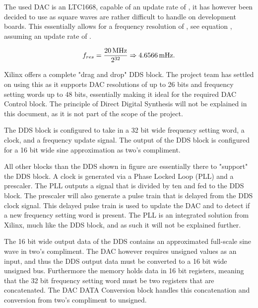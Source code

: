 The used DAC is an LTC1668, capable of an update rate of , it has however been decided to use  as  square waves are rather difficult to handle on development boards. This essentially allows for a frequency resolution of , see equation , assuming an update rate of .

\begin{equation}
    \label{eq:7_2_3_resolution}
    f_{res} = \frac{\SI{20}{\mega\hertz}}{2^{32}} \Rightarrow \SI{4.6566}{\milli\hertz}. 
\end{equation}

Xilinx offers a complete "drag and drop" DDS block. The project team has settled on using this as it supports DAC resolutions of up to 26 bits and frequency setting words up to 48 bits, essentially making it ideal for the required DAC Control block. The principle of Direct Digital Synthesis will not be explained in this document, as it is not part of the scope of the project.

The DDS block is configured to take in a 32 bit wide frequency setting word, a  clock, and a frequency update signal. The output of the DDS block is configured for a 16 bit wide sine approximation as two's compliment.

All other blocks than the DDS shown in figure  are essentially there to "support" the DDS block. A  clock is generated via a Phase Locked Loop (PLL) and a prescaler. The PLL outputs a  signal that is divided by ten and fed to the DDS block. The prescaler will also generate a  pulse train that is delayed from the DDS clock signal. This delayed pulse train is used to update the DAC and to detect if a new frequency setting word is present. The PLL is an integrated solution from Xilinx, much like the DDS block, and as such it will not be explained further.

The 16 bit wide output data of the DDS contains an approximated full-scale sine wave in two's compliment. The DAC however requires unsigned values as an input, and thus the DDS output data must be converted to a 16 bit wide unsigned bus. Furthermore the memory holds data in 16 bit registers, meaning that the 32 bit frequency setting word must be two registers that are concatenated. The DAC DATA Conversion block handles this concatenation and conversion from two's compliment to unsigned.


